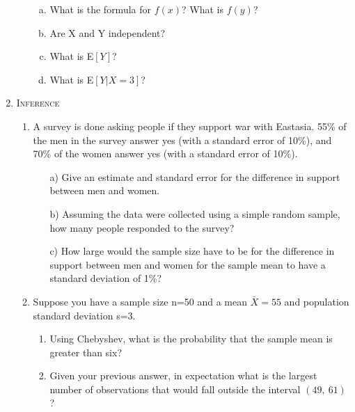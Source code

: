 \documentclass[11pt,letterpaper]{article}
\theoremstyle{definition}
\numberwithin{equation}{section}
\begin{document}
\begin{enumerate}[I]
\begin{enumerate}[1)]
\begin{enumerate}[a)]
\item What is the formula for $f(x)$?  What is $f(y)$? 
\item Are X and Y independent? %
\item What is E$[Y]$? 
\item What is E$[Y|X=3]$? %
\end{enumerate}

\end{enumerate}



\item \textsc{Inference} 

\begin{enumerate}[1)]

\item A survey is done asking people if they support war with Eastasia.  55\% of the men in the survey answer yes (with a standard error of 10\%), and 70\% of the women answer yes (with a standard error of 10\%).
\begin{enumerate}
\item[a)]  Give an estimate and standard error for the difference in support between men and women.
\item[b)]  Assuming the data were collected using a simple random sample, how many people responded to the survey?

\item[c)]  How large would the sample size have to be for the difference in support between men and women for the sample mean to have a standard deviation of 1\%?
\end{enumerate}
\item Suppose you have a sample size n=50 and a mean $\bar{X}=55$ and population standard deviation s=3.  
\begin{enumerate}
\item Using Chebyshev, what is the probability that the sample mean is greater than six?
\item Given your previous answer, in expectation what is the largest number of observations that would fall outside the interval $(49,\ 61)$?


\end{enumerate}
\end{enumerate}
\end{enumerate}
\end{document}
